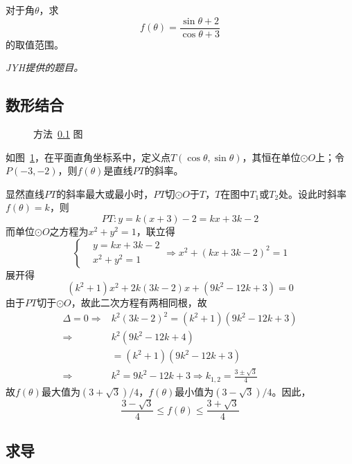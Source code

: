 

对于角$\theta$，求
\[ f(\theta) = \frac{\sin\theta + 2}{\cos\theta + 3} \]
的取值范围。


\emph{JYH提供的题目。}

\subsection{数形结合} \label{subsec:00BE-d}

\begin{figure}[htbp]
  \centering {}
  \caption{方法~\ref{subsec:00BE-d} 图}
  \label{fig:00BE-d}
\end{figure}

如图~\ref{fig:00BE-d}，在平面直角坐标系中，定义点$T(\cos\theta, \sin\theta)$，其恒在单位$\odot O$上；令$P(-3, -2)$，则$f(\theta)$是直线$PT$的斜率。

显然直线$PT$的斜率最大或最小时，$PT$切$\odot O$于$T$，$T$在图中$T_1$或$T_2$处。设此时斜率$f(\theta) = k$，则
\[ PT: y = k(x + 3) - 2 = kx + 3k - 2 \]
而单位$\odot O$之方程为$x^2 + y^2 = 1$，联立得
\[ \left\{\begin{aligned}
  & y = kx + 3k - 2 \\ & x^2 + y^2 = 1
\end{aligned}\right. \Rightarrow x^2 + (kx + 3k - 2)^2 = 1 \]
展开得
\[ \left(k^2 + 1\right)x^2 + 2k(3k - 2)x + \left(9k^2 - 12k + 3\right) = 0 \]
由于$PT$切于$\odot O$，故此二次方程有两相同根，故
\begin{align*}
  \Delta = 0 \Rightarrow{}& k^2(3k - 2)^2 = \left(k^2 + 1\right)\left(9k^2 - 12k + 3\right) \\
  \Rightarrow{}& k^2\left(9k^2 - 12k + 4\right) \\
    &= \left(k^2 + 1\right)\left(9k^2 - 12k + 3\right) \\
  \Rightarrow{}& k^2 = 9k^2 - 12k + 3 \Rightarrow k_{1, 2} = \frac{3 \pm\sqrt3}4
\end{align*}
故$f(\theta)$最大值为$\left(3 + \sqrt3\right)/4$，$f(\theta)$最小值为$\left(3 - \sqrt3\right)/4$。因此，
\[ \frac{3 - \sqrt3}4 \le f(\theta) \le \frac{3 + \sqrt3}4 \]

\subsection{求导}

